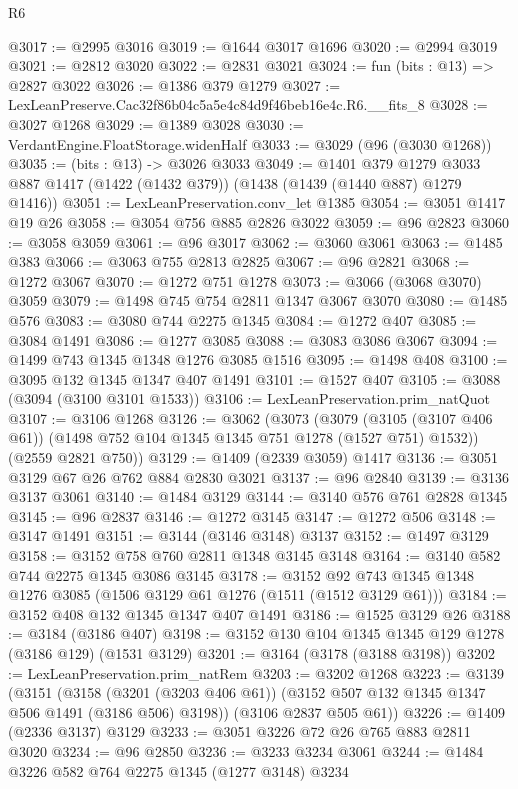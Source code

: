 \begin{lexlean}{R6}
\begin{coremodule}
@3017 := @2995 @3016
@3019 := @1644 @3017 @1696
@3020 := @2994 @3019
@3021 := @2812 @3020
@3022 := @2831 @3021
@3024 := fun (bits : @13) => @2827 @3022
@3026 := @1386 @379 @1279
@3027 := LexLeanPreserve.Cac32f86b04c5a5e4c84d9f46beb16e4c.R6.__fits_8
@3028 := @3027 @1268
@3029 := @1389 @3028
@3030 := VerdantEngine.FloatStorage.widenHalf
@3033 := @3029 (@96 (@3030 @1268))
@3035 := (bits : @13) -> @3026 @3033
@3049 := @1401
    @379
    @1279
    @3033
    @887
    @1417
    (@1422 (@1432 @379))
    (@1438 (@1439 (@1440 @887) @1279 @1416))
@3051 := LexLeanPreservation.conv_let @1385
@3054 := @3051 @1417 @19 @26
@3058 := @3054 @756 @885 @2826 @3022
@3059 := @96 @2823
@3060 := @3058 @3059
@3061 := @96 @3017
@3062 := @3060 @3061
@3063 := @1485 @383
@3066 := @3063 @755 @2813 @2825
@3067 := @96 @2821
@3068 := @1272 @3067
@3070 := @1272 @751 @1278
@3073 := @3066 (@3068 @3070) @3059
@3079 := @1498 @745 @754 @2811 @1347 @3067 @3070
@3080 := @1485 @576
@3083 := @3080 @744 @2275 @1345
@3084 := @1272 @407
@3085 := @3084 @1491
@3086 := @1277 @3085
@3088 := @3083 @3086 @3067
@3094 := @1499 @743 @1345 @1348 @1276 @3085 @1516
@3095 := @1498 @408
@3100 := @3095 @132 @1345 @1347 @407 @1491
@3101 := @1527 @407
@3105 := @3088 (@3094 (@3100 @3101 @1533))
@3106 := LexLeanPreservation.prim_natQuot
@3107 := @3106 @1268
@3126 := @3062
    (@3073
      (@3079 (@3105 (@3107 @406 @61)) (@1498 @752 @104 @1345 @1345 @751 @1278 (@1527 @751) @1532))
      (@2559 @2821 @750))
@3129 := @1409 (@2339 @3059) @1417
@3136 := @3051 @3129 @67 @26 @762 @884 @2830 @3021
@3137 := @96 @2840
@3139 := @3136 @3137 @3061
@3140 := @1484 @3129
@3144 := @3140 @576 @761 @2828 @1345
@3145 := @96 @2837
@3146 := @1272 @3145
@3147 := @1272 @506
@3148 := @3147 @1491
@3151 := @3144 (@3146 @3148) @3137
@3152 := @1497 @3129
@3158 := @3152 @758 @760 @2811 @1348 @3145 @3148
@3164 := @3140 @582 @744 @2275 @1345 @3086 @3145
@3178 := @3152 @92 @743 @1345 @1348 @1276 @3085 (@1506 @3129 @61 @1276 (@1511 (@1512 @3129 @61)))
@3184 := @3152 @408 @132 @1345 @1347 @407 @1491
@3186 := @1525 @3129 @26
@3188 := @3184 (@3186 @407)
@3198 := @3152 @130 @104 @1345 @1345 @129 @1278 (@3186 @129) (@1531 @3129)
@3201 := @3164 (@3178 (@3188 @3198))
@3202 := LexLeanPreservation.prim_natRem
@3203 := @3202 @1268
@3223 := @3139
    (@3151
      (@3158 (@3201 (@3203 @406 @61)) (@3152 @507 @132 @1345 @1347 @506 @1491 (@3186 @506) @3198))
      (@3106 @2837 @505 @61))
@3226 := @1409 (@2336 @3137) @3129
@3233 := @3051 @3226 @72 @26 @765 @883 @2811 @3020
@3234 := @96 @2850
@3236 := @3233 @3234 @3061
@3244 := @1484 @3226 @582 @764 @2275 @1345 (@1277 @3148) @3234

\end{coremodule}
\end{lexlean}
